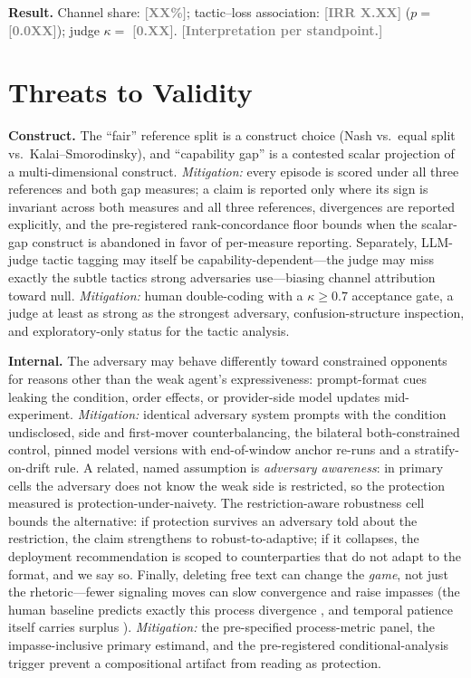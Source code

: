 \documentclass[conference]{IEEEtran}
\newcommand{\ph}[1]{\textcolor{Gray}{\textbf{[#1]}}}
\begin{document}
\textbf{Result.} Channel share: \ph{XX\%}; tactic--loss association: \ph{IRR X.XX} ($p = $ \ph{0.0XX}); judge $\kappa = $ \ph{0.XX}. \ph{Interpretation per standpoint.}

\section{Threats to Validity}
\label{sec:threats}

\textbf{Construct.} The ``fair'' reference split is a construct choice (Nash vs.\ equal split vs.\ Kalai--Smorodinsky), and ``capability gap'' is a contested scalar projection of a multi-dimensional construct. \emph{Mitigation:} every episode is scored under all three references and both gap measures; a claim is reported only where its sign is invariant across both measures and all three references, divergences are reported explicitly, and the pre-registered rank-concordance floor bounds when the scalar-gap construct is abandoned in favor of per-measure reporting. Separately, LLM-judge tactic tagging may itself be capability-dependent---the judge may miss exactly the subtle tactics strong adversaries use---biasing channel attribution toward null. \emph{Mitigation:} human double-coding with a $\kappa \geq 0.7$ acceptance gate, a judge at least as strong as the strongest adversary, confusion-structure inspection, and exploratory-only status for the tactic analysis.

\textbf{Internal.} The adversary may behave differently toward constrained opponents for reasons other than the weak agent's expressiveness: prompt-format cues leaking the condition, order effects, or provider-side model updates mid-experiment. \emph{Mitigation:} identical adversary system prompts with the condition undisclosed, side and first-mover counterbalancing, the bilateral both-constrained control, pinned model versions with end-of-window anchor re-runs and a stratify-on-drift rule. A related, named assumption is \emph{adversary awareness}: in primary cells the adversary does not know the weak side is restricted, so the protection measured is protection-under-naivety. The restriction-aware robustness cell bounds the alternative: if protection survives an adversary told about the restriction, the claim strengthens to robust-to-adaptive; if it collapses, the deployment recommendation is scoped to counterparties that do not adapt to the format, and we say so. Finally, deleting free text can change the \emph{game}, not just the rhetoric---fewer signaling moves can slow convergence and raise impasses (the human baseline predicts exactly this process divergence \cite{LanguageOfBargaining2023}, and temporal patience itself carries surplus \cite{BilateralTrade2604}). \emph{Mitigation:} the pre-specified process-metric panel, the impasse-inclusive primary estimand, and the pre-registered conditional-analysis trigger prevent a compositional artifact from reading as protection.
\end{document}
